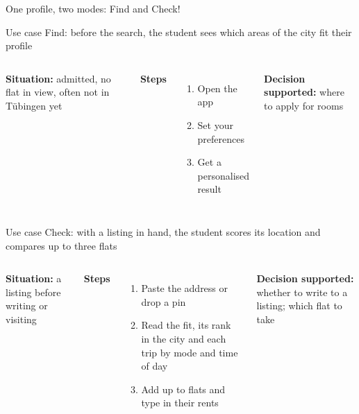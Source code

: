 \documentclass[aspectratio=169,10pt]{beamer}
\begin{document}
\begin{frame}{One profile, two modes: Find and Check!}
  \vspace{5mm}
  \centering\productlinefigure\par
\end{frame}

\begin{frame}{Use case Find: before the search, the student sees which areas of the city fit their
  profile}
  \begin{columns}[T,onlytextwidth]
      \centering\resizebox{\linewidth}{!}{\findmockup}\par
      \footnotesize
      \textbf{Situation:} admitted, no flat in view, often not in Tübingen yet\par\medskip
      \textbf{Steps}
      \begin{enumerate}\footnotesize
        \item Open the app
        \item Set your preferences
        \item Get a personalised result
      \end{enumerate}
      \medskip
      \textbf{Decision supported:} where to apply for rooms
  \end{columns}
\end{frame}

\begin{frame}{Use case Check: with a listing in hand, the student scores its location and
  compares up to three flats}
  \begin{columns}[T,onlytextwidth]
      \centering\resizebox{\linewidth}{!}{\checkmockup}\par
      \footnotesize
      \textbf{Situation:} a listing before writing or visiting\par\medskip
      \textbf{Steps}
      \begin{enumerate}\footnotesize
        \item Paste the address or drop a pin
        \item Read the fit, its rank in the city and each trip by mode and time of day
        \item Add up to \factMaxPlaces{} flats and type in their rents
      \end{enumerate}
      \medskip
      \textbf{Decision supported:} whether to write to a listing; which flat to take
  \end{columns}
\end{frame}
\end{document}
